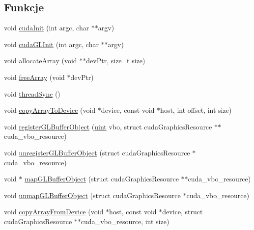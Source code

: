 \subsection*{Funkcje}
\begin{DoxyCompactItemize}
\item 
void \hyperlink{particle_system__cuda_8cu_ad205012a960928f6fb61ea4f51a95e9f}{cuda\-Init} (int argc, char $\ast$$\ast$argv)
\item 
void \hyperlink{particle_system__cuda_8cu_a4e20ffdf94c8d60a5c32ecde149c8554}{cuda\-G\-L\-Init} (int argc, char $\ast$$\ast$argv)
\item 
void \hyperlink{particle_system__cuda_8cu_a781553d31085a23b6d0be9d19982759a}{allocate\-Array} (void $\ast$$\ast$dev\-Ptr, size\-\_\-t size)
\item 
void \hyperlink{particle_system__cuda_8cu_a2946519c8d9c4f8ebf552bf044821ea9}{free\-Array} (void $\ast$dev\-Ptr)
\item 
void \hyperlink{particle_system__cuda_8cu_af59f4c114812beed29874c0a1a31519d}{thread\-Sync} ()
\item 
void \hyperlink{particle_system__cuda_8cu_ac4d4ecd921dbed6c2deef639ca295374}{copy\-Array\-To\-Device} (void $\ast$device, const void $\ast$host, int offset, int size)
\item 
void \hyperlink{particle_system__cuda_8cu_a4386a84282ceeaba09939817aa2a9c24}{register\-G\-L\-Buffer\-Object} (\hyperlink{particles__kernel_8cuh_a91ad9478d81a7aaf2593e8d9c3d06a14}{uint} vbo, struct cuda\-Graphics\-Resource $\ast$$\ast$cuda\-\_\-vbo\-\_\-resource)
\item 
void \hyperlink{particle_system__cuda_8cu_a9afef8c00ca779aae2d7484b45bce34c}{unregister\-G\-L\-Buffer\-Object} (struct cuda\-Graphics\-Resource $\ast$cuda\-\_\-vbo\-\_\-resource)
\item 
void $\ast$ \hyperlink{particle_system__cuda_8cu_aa491077afd740a269815eb9ce81c8642}{map\-G\-L\-Buffer\-Object} (struct cuda\-Graphics\-Resource $\ast$$\ast$cuda\-\_\-vbo\-\_\-resource)
\item 
void \hyperlink{particle_system__cuda_8cu_a98c3325419b7528d34a51ca7972d7095}{unmap\-G\-L\-Buffer\-Object} (struct cuda\-Graphics\-Resource $\ast$cuda\-\_\-vbo\-\_\-resource)
\item 
void \hyperlink{particle_system__cuda_8cu_a54716407dbd516db34f42b2faf7f91a3}{copy\-Array\-From\-Device} (void $\ast$host, const void $\ast$device, struct cuda\-Graphics\-Resource $\ast$$\ast$cuda\-\_\-vbo\-\_\-resource, int size)
\item 

\end{DoxyCompactItemize}
